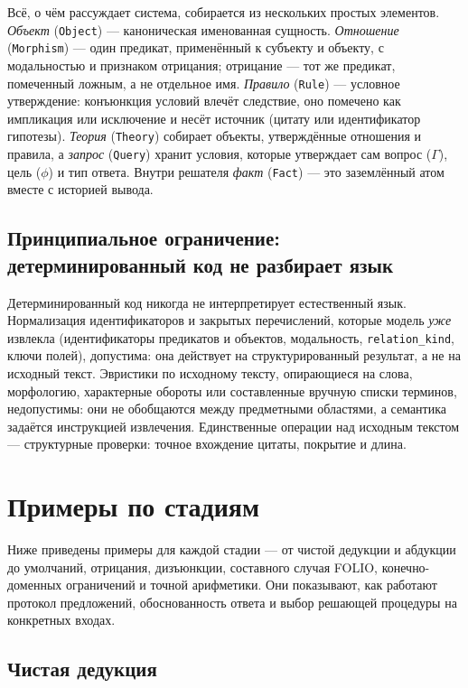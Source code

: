 \documentclass[11pt,a4paper]{article}
\begin{document}
Всё, о чём рассуждает система, собирается из нескольких простых элементов. \emph{Объект} (\texttt{Object}) — каноническая именованная сущность.
\emph{Отношение} (\texttt{Morphism}) — один предикат, применённый к субъекту и объекту, с модальностью и признаком отрицания; отрицание — тот
же предикат, помеченный ложным, а не отдельное имя. \emph{Правило} (\texttt{Rule}) — условное утверждение: конъюнкция условий влечёт следствие,
оно помечено как импликация или исключение и несёт источник (цитату или идентификатор гипотезы). \emph{Теория} (\texttt{Theory}) собирает объекты,
утверждённые отношения и правила, а \emph{запрос} (\texttt{Query}) хранит условия, которые утверждает сам вопрос ($\Gamma$), цель ($\phi$) и
тип ответа. Внутри решателя \emph{факт} (\texttt{Fact}) — это заземлённый атом вместе с историей вывода.

\subsection{Принципиальное ограничение: детерминированный код не разбирает язык}

Детерминированный код никогда не интерпретирует естественный язык. Нормализация идентификаторов и закрытых перечислений, которые модель \emph{уже}
извлекла (идентификаторы предикатов и объектов, модальность, \texttt{relation\_kind}, ключи полей), допустима: она действует на структурированный
результат, а не на исходный текст. Эвристики по исходному тексту, опирающиеся на слова, морфологию, характерные обороты или составленные вручную
списки терминов, недопустимы: они не обобщаются между предметными областями, а семантика задаётся инструкцией извлечения. Единственные операции
над исходным текстом — структурные проверки: точное вхождение цитаты, покрытие и длина.

\section{Примеры по стадиям}
\label{sec:example}

Ниже приведены примеры для каждой стадии — от чистой дедукции и абдукции до умолчаний, отрицания, дизъюнкции,
составного случая FOLIO, конечно-доменных ограничений и точной арифметики. Они показывают, как работают
протокол предложений, обоснованность ответа и выбор решающей процедуры на конкретных входах.

\subsection{Чистая дедукция}
\end{document}
